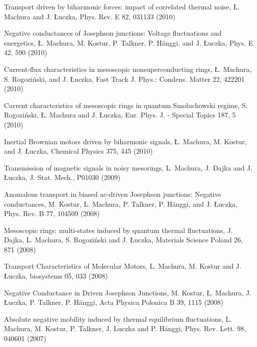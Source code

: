 \begin{etaremune}
\item Transport driven by biharmonic forces: impact of correlated thermal noise, Ł. Machura and J. Łuczka, Phys. Rev. E 82,  031133 (2010)

\item Negative conductances of Josephson junctions: Voltage fluctuations and energetics, Ł. Machura, M. Kostur, P. Talkner, P. Hänggi, and J. Łuczka, Phys. E 42,  590 (2010)

\item Current-flux characteristics in mesoscopic nonsuperconducting rings, Ł. Machura, S. Rogoziński, and J. Łuczka, Fast Track J. Phys.: Condens. Matter 22,  422201 (2010)

\item Current characteristics of mesoscopic rings in quantum Smoluchowski regime, S. Rogoziński, Ł. Machura and J. Łuczka, Eur. Phys. J. - Special Topics 187,  5 (2010) 

\item Inertial Brownian motors driven by biharmonic signals, Ł. Machura, M. Kostur, and J. Łuczka, Chemical Physics 375,  445 (2010)

\item Transmission of magnetic signals in noisy mesorings, L. Machura, J. Dajka and J. Łuczka, J. Stat. Mech.,  P01030 (2009)

\item Anomalous transport in biased ac-driven Josephson junctions: Negative conductances, M. Kostur, L. Machura, P. Talkner, P. Hänggi, and J. Łuczka, Phys. Rev. B 77,  104509 (2008) 

\item Mesoscopic rings: multi-states induced by quantum thermal fluctuations, J. Dajka, L. Machura, S. Rogoziński and J. Łuczka, Materials Science Poland 26,  871 (2008)

\item Transport Characteristics of Molecular Motors, L. Machura, M. Kostur and J. Łuczka, biosystems 05,  033 (2008)

\item Negative Conductance in Driven Josephson Junctions, M. Kostur, Ł. Machura, J. Łuczka, P. Talkner, P. Hänggi, Acta Physica Polonica B 39,  1115 (2008)

\item Absolute negative mobility induced by thermal equilibrium fluctuations, L. Machura, M. Kostur, P. Talkner, J. Luczka and P. Hänggi, Phys. Rev. Lett. 98,  040601 (2007)


\end{etaremune}
